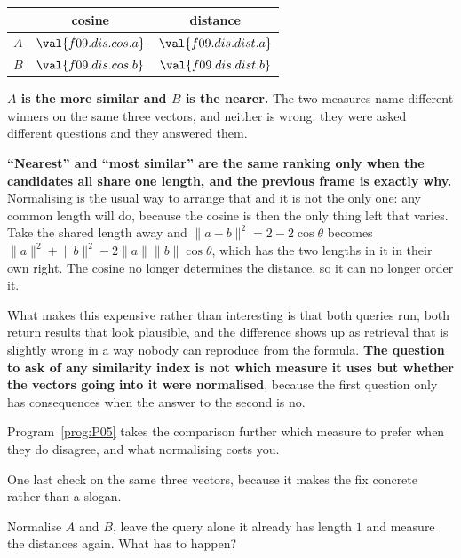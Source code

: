 \begin{fr}
\begin{ansblock}
\begin{center}
\begin{tabular}{lcc}
\toprule
& cosine & distance \\
\midrule
$A$ & $\val{f09.dis.cos.a}$ & $\val{f09.dis.dist.a}$ \\
$B$ & $\val{f09.dis.cos.b}$ & $\val{f09.dis.dist.b}$ \\
\bottomrule
\end{tabular}
\end{center}
\end{ansblock}

\textbf{$A$ is the more similar and $B$ is the nearer.} The two measures name
different winners on the same three vectors, and neither is wrong: they were
asked different questions and they answered them.

\begin{trapbox}
\textbf{\enquote{Nearest} and \enquote{most similar} are the same ranking only
when the candidates all share one length, and the previous frame is exactly
why.} Normalising is the usual way to arrange that and it is not the only one:
any common length will do, because the cosine is then the only thing left that
varies. Take the shared length away and
$\lVert a - b \rVert^{2} = 2 - 2\cos\theta$ becomes
$\lVert a \rVert^{2} + \lVert b \rVert^{2} - 2\lVert a \rVert \lVert b \rVert
\cos\theta$, which has the two lengths in it in their own right. The cosine no
longer determines the distance, so it can no longer order it.

What makes this expensive rather than interesting is that both queries run,
both return results that look plausible, and the difference shows up as
retrieval that is slightly wrong in a way nobody can reproduce from the
formula. \textbf{The question to ask of any similarity index is not which
measure it uses but whether the vectors going into it were normalised}, because
the first question only has consequences when the answer to the second is no.

Program~\ref{prog:P05} takes the comparison further \dash{} which measure to
prefer when they do disagree, and what normalising costs you.
\end{trapbox}
\end{fr}

\begin{fr}
One last check on the same three vectors, because it makes the fix concrete
rather than a slogan.

Normalise $A$ and $B$, leave the query alone \dash{} it already has length $1$
\dash{} and measure the distances again. What has to happen?
\nextframe
\end{fr}

